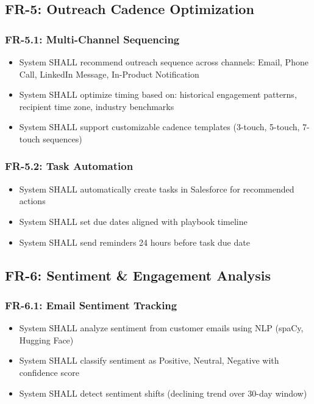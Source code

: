 \documentclass[12pt,a4paper]{article}
\begin{document}
\subsection{FR-5: Outreach Cadence Optimization}
\subsubsection{FR-5.1: Multi-Channel Sequencing}
\begin{itemize}
    \item System SHALL recommend outreach sequence across channels: Email, Phone Call, LinkedIn Message, In-Product Notification
    \item System SHALL optimize timing based on: historical engagement patterns, recipient time zone, industry benchmarks
    \item System SHALL support customizable cadence templates (3-touch, 5-touch, 7-touch sequences)
\end{itemize}
\subsubsection{FR-5.2: Task Automation}
\begin{itemize}
    \item System SHALL automatically create tasks in Salesforce for recommended actions
    \item System SHALL set due dates aligned with playbook timeline
    \item System SHALL send reminders 24 hours before task due date
\end{itemize}

\subsection{FR-6: Sentiment \& Engagement Analysis}
\subsubsection{FR-6.1: Email Sentiment Tracking}
\begin{itemize}
    \item System SHALL analyze sentiment from customer emails using NLP (spaCy, Hugging Face)
    \item System SHALL classify sentiment as Positive, Neutral, Negative with confidence score
    \item System SHALL detect sentiment shifts (declining trend over 30-day window)
\end{itemize}
\end{document}
